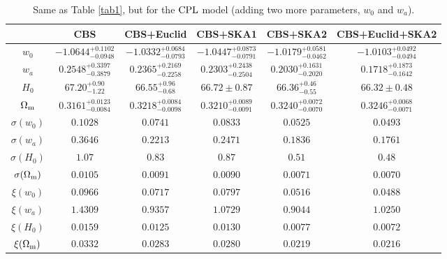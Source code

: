 \documentclass[aps,prd,amsmath,amssymb,showpacs,floats,floatfix,nofootinbib,reprint]{revtex4-1}
\begin{document}
\begin{table}
\renewcommand{\arraystretch}{1.5}
\caption{\label{tab3}Same as Table \ref{tab1}, but for the ${\rm CPL}$ model (adding two more parameters, $w_{0}$ and $w_{a}$). 
}
\begin{tabular}{|c|c c c c c|}
\hline
&CBS&CBS+Euclid&CBS+SKA1&CBS+SKA2&CBS+Euclid+SKA2\\
\hline
$w_0$&$-1.0644^{+0.1102}_{-0.0948}$&$-1.0332^{+0.0684}_{-0.0793}$&$-1.0447^{+0.0873}_{-0.0791}$&$-1.0179^{+0.0581}_{-0.0462}$&$-1.0103^{+0.0492}_{-0.0494}$\\
 $w_a$&$0.2548^{+0.3397}_{-0.3879}$&$0.2365^{+0.2169}_{-0.2258}$&$0.2303^{+0.2438}_{-0.2504}$&$0.2030^{+0.1631}_{-0.2020}$&$0.1718^{+0.1873}_{-0.1642}$\\
  $H_0$&$67.20^{+0.90}_{-1.22}$&$66.55^{+0.96}_{-0.68}$&$66.72\pm0.87$&$66.36^{+0.46}_{-0.55}$&$66.32\pm0.48$\\
 $\Omega_{\rm m}$&$0.3161^{+0.0123}_{-0.0084}$&$0.3218^{+0.0084}_{-0.0098}$&$0.3210^{+0.0089}_{-0.0091}$&$0.3240^{+0.0072}_{-0.0070}$&$0.3246^{+0.0068}_{-0.0071}$\\

\hline
  $\sigma(w_0)$&$0.1028$&$0.0741$&$0.0833$&$0.0525$&$0.0493$\\
  $\sigma(w_a)$&$0.3646$&$0.2213$&$0.2471$&$0.1836$&$0.1761$\\
  $\sigma(H_0)$&$1.07$&$0.83$&$0.87$&$0.51$&$0.48$\\
  $\sigma(\Omega_{\rm m})$&$0.0105$&$0.0091$&$0.0090$&$0.0071$&$0.0070$\\
\hline
$\xi(w_0)$&$0.0966$&$0.0717$&$0.0797$&$0.0516$&$0.0488$\\
$\xi(w_a)$&$1.4309$&$0.9357$&$1.0729$&$0.9044$&$1.0250$\\
$\xi(H_0)$&$0.0159$&$0.0125$&$0.0130$&$0.0077$&$0.0072$\\
  $\xi(\Omega_{\rm m})$&$0.0332$&$0.0283$&$0.0280$&$0.0219$&$0.0216$\\
\hline
\end{tabular}
\end{table}
\end{document}
